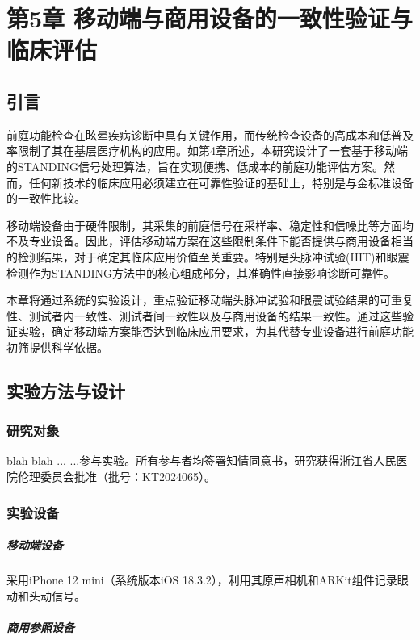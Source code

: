 \chapter{第5章 移动端与商用设备的一致性验证与临床评估}

\section{引言}

前庭功能检查在眩晕疾病诊断中具有关键作用，而传统检查设备的高成本和低普及率限制了其在基层医疗机构的应用。如第4章所述，本研究设计了一套基于移动端的STANDING信号处理算法，旨在实现便携、低成本的前庭功能评估方案。然而，任何新技术的临床应用必须建立在可靠性验证的基础上，特别是与金标准设备的一致性比较。

移动端设备由于硬件限制，其采集的前庭信号在采样率、稳定性和信噪比等方面均不及专业设备。因此，评估移动端方案在这些限制条件下能否提供与商用设备相当的检测结果，对于确定其临床应用价值至关重要。特别是头脉冲试验(HIT)和眼震检测作为STANDING方法中的核心组成部分，其准确性直接影响诊断可靠性。

本章将通过系统的实验设计，重点验证移动端头脉冲试验和眼震试验结果的可重复性、测试者内一致性、测试者间一致性以及与商用设备的结果一致性。通过这些验证实验，确定移动端方案能否达到临床应用要求，为其代替专业设备进行前庭功能初筛提供科学依据。

\section{实验方法与设计}

\subsection{研究对象}

blah blah ... ...参与实验。所有参与者均签署知情同意书，研究获得浙江省人民医院伦理委员会批准（批号：KT2024065）。


\subsection{实验设备}

\paragraph{移动端设备}

采用iPhone 12 mini（系统版本iOS 18.3.2），利用其原声相机和ARKit组件记录眼动和头动信号。

\paragraph{商用参照设备}

